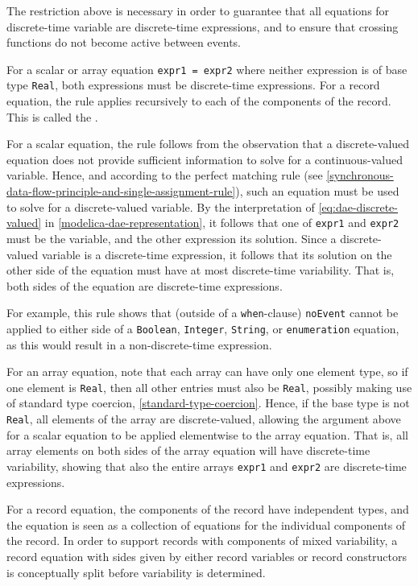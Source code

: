 \begin{nonnormative}
The restriction above is necessary in order to guarantee that all equations for discrete-time variable are discrete-time expressions, and to ensure that crossing functions do not become active between events.
\end{nonnormative}

For a scalar or array equation \lstinline!expr1 = expr2! where neither expression is of base type \lstinline!Real!, both expressions must be discrete-time expressions.
For a record equation, the rule applies recursively to each of the components of the record.
This is called the .

\begin{nonnormative}
For a scalar equation, the rule follows from the observation that a discrete-valued equation does not provide sufficient information to solve for a continuous-valued variable.
Hence, and according to the perfect matching rule (see \cref{synchronous-data-flow-principle-and-single-assignment-rule}), such an equation must be used to solve for a discrete-valued variable.
By the interpretation of \eqref{eq:dae-discrete-valued} in \cref{modelica-dae-representation}, it follows that one of \lstinline!expr1! and \lstinline!expr2! must be the variable, and the other expression its solution.
Since a discrete-valued variable is a discrete-time expression, it follows that its solution on the other side of the equation must have at most discrete-time variability.
That is, both sides of the equation are discrete-time expressions.

For example, this rule shows that (outside of a \lstinline!when!-clause) \lstinline!noEvent! cannot be applied to either side of a \lstinline!Boolean!, \lstinline!Integer!, \lstinline!String!, or \lstinline!enumeration! equation, as this would result in a non-discrete-time expression.

For an array equation, note that each array can have only one element type, so if one element is \lstinline!Real!, then all other entries must also be \lstinline!Real!, possibly making use of standard type coercion, \cref{standard-type-coercion}.
Hence, if the base type is not \lstinline!Real!, all elements of the array are discrete-valued, allowing the argument above for a scalar equation to be applied elementwise to the array equation.
That is, all array elements on both sides of the array equation will have discrete-time variability, showing that also the entire arrays \lstinline!expr1! and \lstinline!expr2! are discrete-time expressions.

For a record equation, the components of the record have independent types, and the equation is seen as a collection of equations for the individual components of the record.
In order to support records with components of mixed variability, a record equation with sides given by either record variables or record constructors is conceptually split before variability is determined.
\end{nonnormative}

